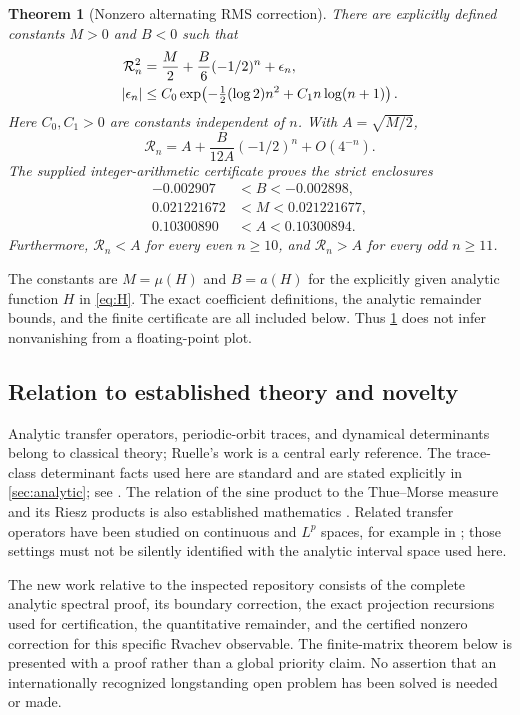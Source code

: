 \documentclass[11pt,a4paper]{article}
\newtheorem{theorem}{Theorem}[section]
\theoremstyle{definition}
\theoremstyle{remark}
\numberwithin{equation}{section}
\begin{document}
\begin{theorem}[Nonzero alternating RMS correction]
\label{thm:intro-rms}
There are explicitly defined constants $M>0$ and $B<0$ such that
\begin{align}
 \mathcal R_n^2&=\frac M2+\frac B6(-1/2)^n+\epsilon_n,\notag\\
 |\epsilon_n|&\le C_0\exp\!\left(-\tfrac12(\log2)n^2+C_1n\log(n+1)\right).
 \label{eq:RMSmainintro}
\end{align}
Here $C_0,C_1>0$ are constants independent of $n$. With $A=\sqrt{M/2}$,
\begin{equation}
 \mathcal R_n=A+\frac{B}{12A}(-1/2)^n+O(4^{-n}).
 \label{eq:RMSrootintro}
\end{equation}
The supplied integer-arithmetic certificate proves the strict enclosures
\begin{align}
 -0.002907&<B<-0.002898,\label{eq:Bboundsintro}\\
 0.021221672&<M<0.021221677,\label{eq:Mboundsintro}\\
 0.10300890&<A<0.10300894.\label{eq:Aboundsintro}
\end{align}
Furthermore, $\mathcal R_n<A$ for every even $n\ge10$, and
$\mathcal R_n>A$ for every odd $n\ge11$.
\end{theorem}

The constants are $M=\mu(H)$ and $B=a(H)$ for the explicitly given analytic
function $H$ in \cref{eq:H}. The exact coefficient definitions, the analytic
remainder bounds, and the finite certificate are all included below. Thus
\cref{thm:intro-rms} does not infer nonvanishing from a floating-point plot.

\subsection{Relation to established theory and novelty}
Analytic transfer operators, periodic-orbit traces, and dynamical determinants
belong to classical theory; Ruelle's work \cite{ruelle} is a central early
reference. The trace-class determinant facts used here are standard and are
stated explicitly in \cref{sec:analytic}; see \cite{simon,bornemann}.
The relation of the sine product to the Thue--Morse measure and its Riesz
products is also established mathematics \cite{baake}. Related transfer
operators have been studied on continuous and $L^p$ spaces, for example in
\cite{dutkay}; those settings must not be silently identified with the
analytic interval space used here.

The new work relative to the inspected repository consists of the complete
analytic spectral proof, its boundary correction, the exact projection
recursions used for certification, the quantitative remainder, and the
certified nonzero correction for this specific Rvachev observable. The
finite-matrix theorem below is presented with a proof rather than a global
priority claim. No assertion that an internationally recognized longstanding
open problem has been solved is needed or made.
\end{document}
